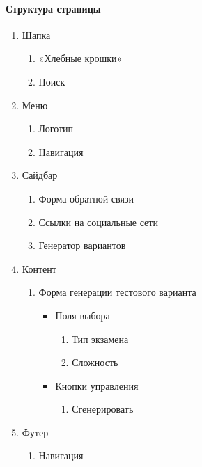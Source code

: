 \paragraph{Структура страницы}
\begin{enumerate}
	\item Шапка
	\begin{enumerate}
		\item «Хлебные крошки»
		\item Поиск
	\end{enumerate}

	\item Меню
	\begin{enumerate}
		\item Логотип
		\item Навигация
	\end{enumerate}

	\item Сайдбар
	\begin{enumerate}
		\item Форма обратной связи
		\item Ссылки на социальные сети
		\item Генератор вариантов
	\end{enumerate}

	\item Контент
	\begin{enumerate}
		\item Форма генерации тестового варианта
		\begin{itemize}
			\item Поля выбора
			\begin{enumerate}
				\item Тип экзамена
				\item Сложность
			\end{enumerate}

			\item Кнопки управления
			\begin{enumerate}
				\item Сгенерировать
			\end{enumerate}
		\end{itemize}
	\end{enumerate}

	\item Футер
	\begin{enumerate}
		\item Навигация
	\end{enumerate}
\end{enumerate}


